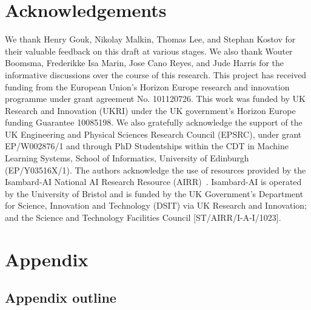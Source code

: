 \documentclass{article}
\begin{document}
\section*{Acknowledgements}
We thank Henry Gouk, Nikolay Malkin, Thomas Lee, and Stephan Kostov for their valuable feedback on this draft at various stages. We also thank Wouter Boomsma, Frederikke Isa Marin, Jose Cano Reyes, and Jude Harris for the informative discussions over the course of this research. This project has received funding from the European Union’s Horizon Europe research and innovation programme under grant agreement No. 101120726. This work was funded by UK Research and Innovation (UKRI) under the UK government’s Horizon Europe funding Guarantee 10085198. We also gratefully acknowledge the support of the UK Engineering and Physical Sciences Research Council (EPSRC), under grant EP/W002876/1 and through PhD Studentships within the CDT in Machine Learning Systems, School of Informatics, University of Edinburgh (EP/Y03516X/1). The authors acknowledge the use of resources provided by the Isambard-AI National AI Research Resource (AIRR)~\citep{mcintosh2024isambard}. Isambard-AI is operated by the University of Bristol and is funded by the UK Government's Department for Science, Innovation and Technology (DSIT) via UK Research and Innovation; and the Science and Technology Facilities Council [ST/AIRR/I-A-I/1023].




\newpage
\appendix
\onecolumn
\section*{Appendix}

\subsection*{Appendix outline}
\end{document}
